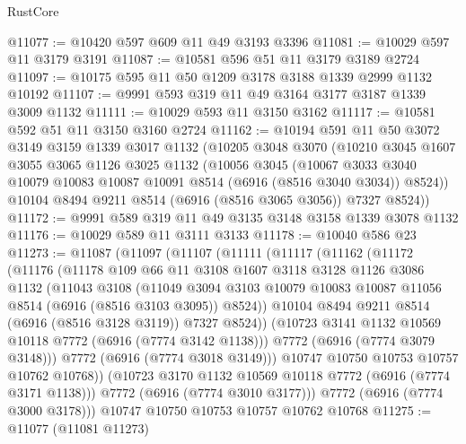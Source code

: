 \begin{lexlean}{RustCore}
\begin{coremodule}
@11077 := @10420 @597 @609 @11 @49 @3193 @3396
@11081 := @10029 @597 @11 @3179 @3191
@11087 := @10581 @596 @51 @11 @3179 @3189 @2724
@11097 := @10175 @595 @11 @50 @1209 @3178 @3188 @1339 @2999 @1132 @10192
@11107 := @9991 @593 @319 @11 @49 @3164 @3177 @3187 @1339 @3009 @1132
@11111 := @10029 @593 @11 @3150 @3162
@11117 := @10581 @592 @51 @11 @3150 @3160 @2724
@11162 := @10194
    @591
    @11
    @50
    @3072
    @3149
    @3159
    @1339
    @3017
    @1132
    (@10205
      @3048
      @3070
      (@10210
        @3045
        @1607
        @3055
        @3065
        @1126
        @3025
        @1132
        (@10056
          @3045
          (@10067 @3033 @3040 @10079 @10083 @10087 @10091 @8514 (@6916 (@8516 @3040 @3034)) @8524))
        @10104
        @8494
        @9211
        @8514
        (@6916 (@8516 @3065 @3056))
        @7327
        @8524))
@11172 := @9991 @589 @319 @11 @49 @3135 @3148 @3158 @1339 @3078 @1132
@11176 := @10029 @589 @11 @3111 @3133
@11178 := @10040 @586 @23
@11273 := @11087
    (@11097
      (@11107
        (@11111
          (@11117
            (@11162
              (@11172
                (@11176
                  (@11178
                    @109
                    @66
                    @11
                    @3108
                    @1607
                    @3118
                    @3128
                    @1126
                    @3086
                    @1132
                    (@11043
                      @3108
                      (@11049
                        @3094
                        @3103
                        @10079
                        @10083
                        @10087
                        @11056
                        @8514
                        (@6916 (@8516 @3103 @3095))
                        @8524))
                    @10104
                    @8494
                    @9211
                    @8514
                    (@6916 (@8516 @3128 @3119))
                    @7327
                    @8524))
                (@10723 @3141 @1132 @10569 @10118 @7772 (@6916 (@7774 @3142 @1138)))
                @7772
                (@6916 (@7774 @3079 @3148)))
              @7772
              (@6916 (@7774 @3018 @3149)))
            @10747
            @10750
            @10753
            @10757
            @10762
            @10768))
        (@10723 @3170 @1132 @10569 @10118 @7772 (@6916 (@7774 @3171 @1138)))
        @7772
        (@6916 (@7774 @3010 @3177)))
      @7772
      (@6916 (@7774 @3000 @3178)))
    @10747
    @10750
    @10753
    @10757
    @10762
    @10768
@11275 := @11077 (@11081 @11273)

\end{coremodule}
\end{lexlean}
